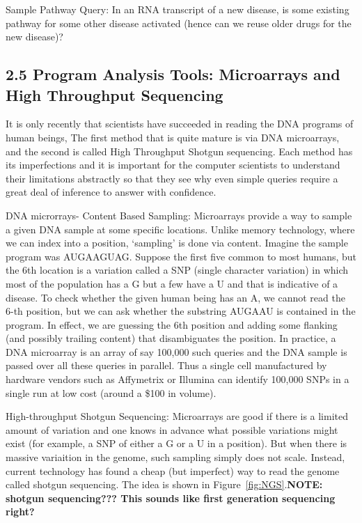 \documentclass[10pt,fullpage]{article}
\begin{document}
Sample Pathway Query: In an RNA transcript of a new disease, is some
existing pathway for some other disease activated (hence can we reuse
older drugs for the new disease)?

\subsection{2.5 Program Analysis Tools: Microarrays and High Throughput Sequencing}
\label{sec:analysistools}
It is only recently that scientists have succeeded in reading the DNA
programs of human beings, The first method that is quite mature is via
DNA microarrays, and the second is called High Throughput Shotgun
sequencing.  Each method has its imperfections and it is important for
the computer scientists to understand their limitations abstractly so
that they see why even simple queries require a great deal of
inference to answer with confidence.

DNA microrrays- Content Based Sampling: Microarrays provide a way to
sample a given DNA sample at some specific locations.  Unlike memory
technology, where we can index into a position, `sampling' is done via
content.  Imagine the sample program was AUGAAGUAG.  Suppose the first
five common to most humans, but the 6th location is a variation called
a SNP (single character variation) in which most of the population has
a G but a few have a U and that is indicative of a disease.  To check
whether the given human being has an A, we cannot read the 6-th
position, but we can ask whether the substring AUGAAU is contained in
the program.  In effect, we are guessing the 6th position and adding
some flanking (and possibly trailing content) that disambiguates the
position.  In practice, a DNA microarray is an array of say 100,000
such queries and the DNA sample is passed over all these queries in
parallel.  Thus a single cell manufactured by hardware vendors such as
Affymetrix or Illumina can identify 100,000 SNPs in a single run at
low cost (around a \$100 in volume).

High-throughput Shotgun Sequencing: Microarrays are good if there is a
limited amount of variation and one knows in advance what possible
variations might exist (for example, a SNP of either a G or a U in a
position).  But when there is massive variaition in the genome, such
sampling simply does not scale.  Instead, current technology has found
a cheap (but imperfect) way to read the genome called shotgun
sequencing.  The idea is shown in Figure~\ref{fig:NGS}.{\bf NOTE:
shotgun sequencing??? This sounds like first generation sequencing
right?}
\end{document}
